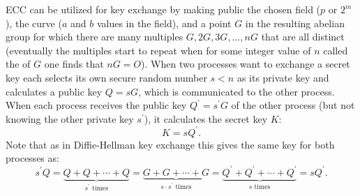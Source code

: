 ECC can be utilized for key exchange by making public the
chosen field ($p$ or $2^m$), the curve ($a$ and $b$ values in the field),
and a point $G$ in the resulting abelian group for which there are many multiples
$G, 2G, 3G, \dots, nG$ that are all distinct
(eventually the multiples start to repeat when for some integer value of $n$ called the
 of $G$ one finds that $nG=O$).
When two processes want to exchange a secret key each selects its own secure
random number $s<n$ as its private key and calculates a public key
$Q=sG$, which is communicated to the other process.
When each process receives the public key $Q^\prime=s^\prime G$ of the other process
(but not knowing the other private key $s^\prime$), it calculates the secret key $K$:
\begin{displaymath}
  K = s Q^\prime.
\end{displaymath}
Note that as in Diffie-Hellman key exchange this gives the same key for
both processes as:
\begin{displaymath}
  s^\prime Q
  = \underbrace{Q+Q+\cdots+Q}_{s^\prime\mbox{ times}}
  = \underbrace{G+G+\cdots+G}_{s\cdot s^\prime\mbox{ times}}
  = \underbrace{Q^\prime+Q^\prime+\cdots+Q^\prime}_{s\mbox{ times}}
  = s Q^\prime.
\end{displaymath}

